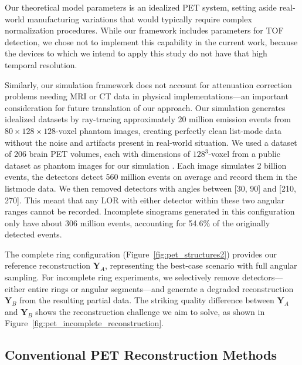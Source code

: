 \documentclass[12pt]{iopart}
\begin{document}
Our theoretical model parameters is an idealized PET system, setting aside real-world manufacturing variations that would typically require complex normalization procedures. 
While our framework includes parameters for TOF detection, we chose not to implement this capability in the current work, because the devices to which we intend to apply this study do not have that high temporal resolution. 

Similarly, our simulation framework does not account for attenuation correction problems needing MRI or CT data in physical implementations—an important consideration for future translation of our approach. Our simulation generates idealized datasets by ray-tracing approximately 20 million emission events from $80\times128\times128$-voxel phantom images, creating perfectly clean list-mode data without the noise and artifacts present in real-world situation. 
We used a dataset of 206 brain PET volumes, each with dimensions of $128^3$-voxel from a public dataset as phantom images for our simulation \cite{Han2023DiffusionPET}. Each image simulates 2 billion events, the detectors detect 560 million events on average and record them in the listmode data. We then removed detectors with angles between [30\degree, 90\degree] and [210\degree, 270\degree]. This meant that any LOR with either detector within these two angular ranges cannot be recorded. Incomplete sinograms generated in this configuration only have about 306 million events, accounting for 54.6\% of the originally detected events.

The complete ring configuration (Figure~\ref{fig:pet_structures2}) provides our reference reconstruction $\mathbf{Y}_A$, representing the best-case scenario with full angular sampling. For incomplete ring experiments, we selectively remove detectors—either entire rings or angular segments—and generate a degraded reconstruction $\mathbf{Y}_B$ from the resulting partial data. The striking quality difference between $\mathbf{Y}_A$ and $\mathbf{Y}_B$ shows the reconstruction challenge we aim to solve, as shown in Figure~\ref{fig:pet_incomplete_reconstruction}.

\subsection{Conventional PET Reconstruction Methods}
\end{document}
